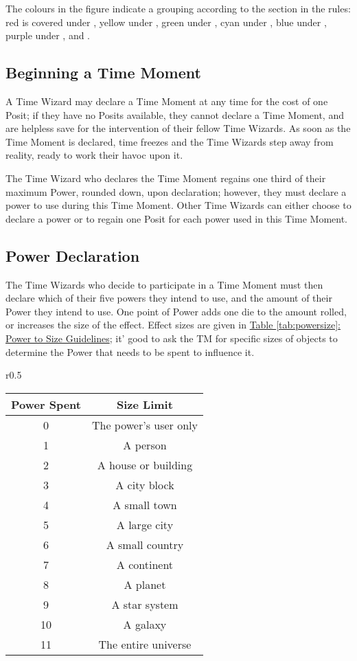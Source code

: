 \documentclass{article}
\begin{document}
The colours in the figure indicate a grouping according to the section in the rules: red is
covered under , yellow under , green
under , cyan under , blue under
, purple under , and
.

\subsection{Beginning a Time Moment} \label{ssec:begin-moment}
A Time Wizard may declare a Time Moment at any time for the cost of one Posit; if they have no
Posits available, they cannot declare a Time Moment, and are helpless save for the intervention
of their fellow Time Wizards. As soon as the Time Moment is declared, time freezes and the
Time Wizards step away from reality, ready to work their havoc upon it.

The Time Wizard who declares the Time Moment regains one third of their maximum Power, rounded
down, upon declaration; however, they must declare a power to use during this Time Moment. Other
Time Wizards can either choose to declare a power or to regain one Posit for each power used in
this Time Moment.

\subsection{Power Declaration} \label{ssec:power-declaration}
The Time Wizards who decide to participate in a Time Moment must then declare which of their
five powers they intend to use, and the amount of their Power they intend to use. One point of
Power adds one die to the amount rolled, or increases the size of the effect. Effect sizes are
given in \hyperref[tab:powersize]{Table \ref*{tab:powersize}: Power to Size Guidelines}; it'
good to ask the TM for specific sizes of objects to determine the Power that needs to be spent
to influence it.

\begin{wraptable}{r}{0.5\textwidth}
   \caption{Power to Size Guidelines}
   \label{tab:powersize}

   \begin{tabular}{c|c}
      \textbf{Power Spent} & {Size Limit}\\ \hline
      0 & The power's user only\\
      1 & A person\\
      2 & A house or building\\
      3 & A city block\\
      4 & A small town\\
      5 & A large city\\
      6 & A small country\\
      7 & A continent\\
      8 & A planet\\
      9 & A star system\\
      10 & A galaxy\\
      11 & The entire universe
   \end{tabular}
\end{wraptable}
\end{document}
